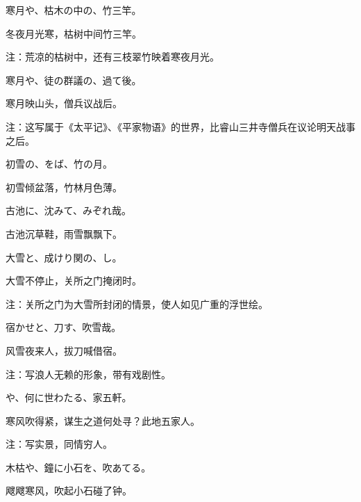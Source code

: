 \begin{haiku}
    {\FH 寒月や、枯木の中の、竹三竿。}

    {\FK 冬夜月光寒，枯树中间竹三竿。}

    {\FT 注：荒凉的枯树中，还有三枝翠竹映着寒夜月光。}
\end{haiku}

\begin{haiku}
    {\FH 寒月や、徒の群議の、過て後。}

    {\FK 寒月映山头，僧兵议战后。}

    {\FT 注：这写属于《太平记》、《平家物语》的世界，比睿山三井寺僧兵在议论明天战事之后。}
\end{haiku}

\begin{haiku}
    {\FH 初雪の、をば、竹の月。}

    {\FK 初雪倾盆落，竹林月色薄。}
\end{haiku}

\begin{haiku}
    {\FH 古池に、沈みて、みぞれ哉。}

    {\FK 古池沉草鞋，雨雪飘飘下。}
\end{haiku}

\begin{haiku}
    {\FH 大雪と、成けり関の、し。}

    {\FK 大雪不停止，关所之门掩闭时。}

    {\FT 注：关所之门为大雪所封闭的情景，使人如见广重的浮世绘。}
\end{haiku}

\begin{haiku}
    {\FH 宿かせと、刀す、吹雪哉。}

    {\FK 风雪夜来人，拔刀喊借宿。}

    {\FT 注：写浪人无赖的形象，带有戏剧性。}
\end{haiku}

\begin{haiku}
    {\FH {}や、何に世わたる、家五軒。}

    {\FK 寒风吹得紧，谋生之道何处寻？此地五家人。}

    {\FT 注：写实景，同情穷人。}
\end{haiku}

\begin{haiku}
    {\FH 木枯や、鐘に小石を、吹あてる。}

    {\FK 飕飕寒风，吹起小石碰了钟。}
\end{haiku}

